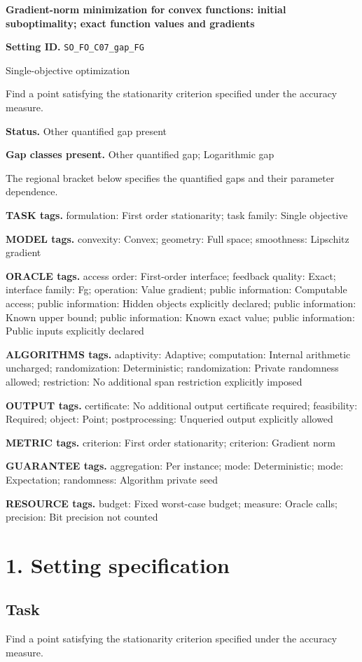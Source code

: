 \documentclass[10pt,a4paper]{article}
\begin{document}
\raggedright

{\LARGE\bfseries\sffamily\color{AtlasNavy} Gradient-norm minimization for convex functions: initial suboptimality; exact function values and gradients\par}\vspace{5pt}
\textbf{Setting ID.} \texttt{SO\_\allowbreak{}FO\_\allowbreak{}C07\_\allowbreak{}gap\_\allowbreak{}FG}

Single-objective optimization

Find a point satisfying the stationarity criterion specified under the accuracy measure.

\textbf{Status.} Other quantified gap present

\textbf{Gap classes present.} Other quantified gap; Logarithmic gap

The regional bracket below specifies the quantified gaps and their parameter dependence.

\textbf{TASK tags.} formulation: First order stationarity; task family: Single objective

\textbf{MODEL tags.} convexity: Convex; geometry: Full space; smoothness: Lipschitz gradient

\textbf{ORACLE tags.} access order: First-order interface; feedback quality: Exact; interface family: Fg; operation: Value gradient; public information: Computable access; public information: Hidden objects explicitly declared; public information: Known upper bound; public information: Known exact value; public information: Public inputs explicitly declared

\textbf{ALGORITHMS tags.} adaptivity: Adaptive; computation: Internal arithmetic uncharged; randomization: Deterministic; randomization: Private randomness allowed; restriction: No additional span restriction explicitly imposed

\textbf{OUTPUT tags.} certificate: No additional output certificate required; feasibility: Required; object: Point; postprocessing: Unqueried output explicitly allowed

\textbf{METRIC tags.} criterion: First order stationarity; criterion: Gradient norm

\textbf{GUARANTEE tags.} aggregation: Per instance; mode: Deterministic; mode: Expectation; randomness: Algorithm private seed

\textbf{RESOURCE tags.} budget: Fixed worst-case budget; measure: Oracle calls; precision: Bit precision not counted

\section{1. Setting specification}
\subsection{Task}
Find a point satisfying the stationarity criterion specified under the accuracy measure.
\end{document}
